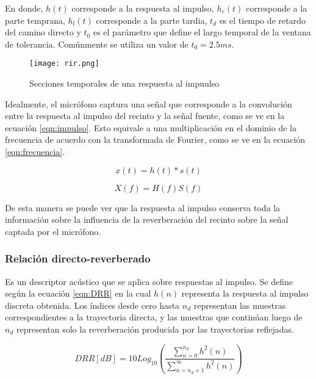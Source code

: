 En donde, $h(t)$ corresponde a la respuesta al impulso, $h_{e}(t)$ corresponde a la parte temprana, $h_{l}(t)$ corresponde a la parte tardia, $t_{d}$ es el tiempo de retardo del camino directo y $t_{0}$ es el parámetro que define el largo temporal de la ventana de tolerancia. Comúnmente se utiliza un valor de $t_{0} = 2.5 ms$.

\begin{figure}[H]
  \centering{}
  \texttt{[image: rir.png]}
  \caption{Secciones temporales de una respuesta al impuulso}
  \label{fig:rir}
\end{figure}

Idealmente, el micrófono captura una señal que corresponde a la convolución entre la respuesta al impulso del recinto y la señal fuente, como se ve en la ecuación \ref{eqn:impulso}. Esto equivale a una multiplicación en el dominio de la frecuencia de acuerdo con la transformada de Fourier, como se ve en la ecuación \ref{eqn:frecuencia}.  


\begin{equation}
\label{eqn:impulso}
	x(t) = h(t) * s(t)
\end{equation} 

\begin{equation}
\label{eqn:frecuencia}
	X(f) = H(f)S(f)
\end{equation} 

De esta manera se puede ver que la respuesta al impulso conserva toda la información sobre la influencia de la reverberación del recinto sobre la señal captada por el micrófono. 

\subsubsection{Relación directo-reverberado}

Es un descriptor acústico que se aplica sobre respuestas al impulso. Se define según la ecuación \ref{eqn:DRR} en la cual $h(n)$ representa la respuesta al impulso discreta obtenida. Los índices desde cero hasta $n_{d}$ representan las muestras correspondientes a la trayectoria directa, y las muestras que continúan luego de $n_{d}$ representan solo la reverberación producida por las trayectorias reflejadas. 

\begin{equation}
\label{eqn:DRR}
	DRR  [dB]= 10 Log_{10}(\frac{\sum_{n=0}^{n_d}h^{2}(n)}{\sum_{n=n_{d}+1}^{\infty}h^{2}(n)}) 
\end{equation}

